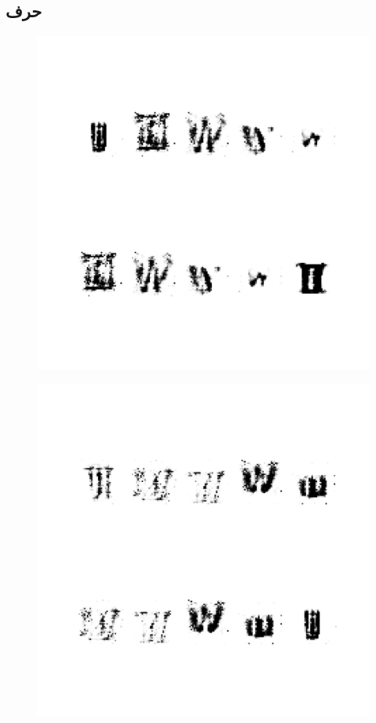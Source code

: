 \documentclass{article}
\begin{document}
\subsection{حرف }
\begin{figure}[H]
	\centerline{\includegraphics[width=\textwidth , height=\textheight ]{../results/CGAN_Adam/figs/letters/W/95.pdf}}
\end{figure}
\begin{figure}[H]
	\centerline{\includegraphics[width=\textwidth , height=\textheight ]{../results/CGAN_Adam/figs/letters/W/90.pdf}}
\end{figure}
\end{document}
